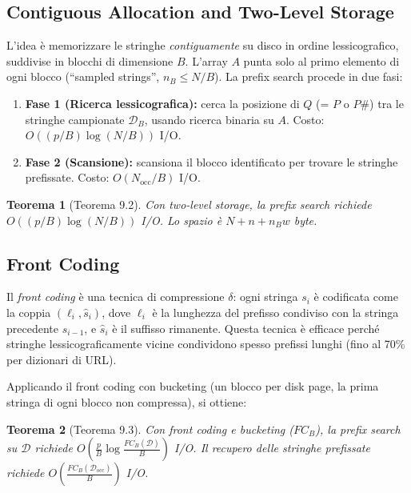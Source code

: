 \documentclass[12pt, a4paper, oneside]{book}
\theoremstyle{plain}
\newtheorem{teorema}{Teorema}[chapter]
\theoremstyle{definition}
\theoremstyle{remark}
\begin{document}
\subsection{Contiguous Allocation and Two-Level Storage}

L'idea è memorizzare le stringhe \emph{contiguamente} su disco in ordine lessicografico, suddivise in blocchi di dimensione $B$. L'array $A$ punta solo al primo elemento di ogni blocco (``sampled strings'', $n_B \le N/B$). La prefix search procede in due fasi:

\begin{enumerate}
  \item \textbf{Fase 1 (Ricerca lessicografica):} cerca la posizione di $Q$ (= $P$ o $P\#$) tra le stringhe campionate $\mathcal{D}_B$, usando ricerca binaria su $A$. Costo: $O((p/B)\log(N/B))$ I/O.
  \item \textbf{Fase 2 (Scansione):} scansiona il blocco identificato per trovare le stringhe prefissate. Costo: $O(N_{\mathrm{occ}}/B)$ I/O.
\end{enumerate}

\begin{teorema}[Teorema 9.2]
Con two-level storage, la prefix search richiede $O((p/B)\log(N/B))$ I/O. Lo spazio è $N + n + n_B w$ byte.
\end{teorema}

\subsection{Front Coding}

Il \emph{front coding} è una tecnica di compressione $\delta$: ogni stringa $s_i$ è codificata come la coppia $(\ell_i, \hat{s}_i)$, dove $\ell_i$ è la lunghezza del prefisso condiviso con la stringa precedente $s_{i-1}$, e $\hat{s}_i$ è il suffisso rimanente. Questa tecnica è efficace perché stringhe lessicograficamente vicine condividono spesso prefissi lunghi (fino al 70\% per dizionari di URL).

Applicando il front coding con bucketing (un blocco per disk page, la prima stringa di ogni blocco non compressa), si ottiene:

\begin{teorema}[Teorema 9.3]
Con front coding e bucketing ($FC_B$), la prefix search su $\mathcal{D}$ richiede $O\!\left(\frac{p}{B}\log\frac{FC_B(\mathcal{D})}{B}\right)$ I/O. Il recupero delle stringhe prefissate richiede $O\!\left(\frac{FC_B(\mathcal{D}_{\mathrm{occ}})}{B}\right)$ I/O.
\end{teorema}
\end{document}
